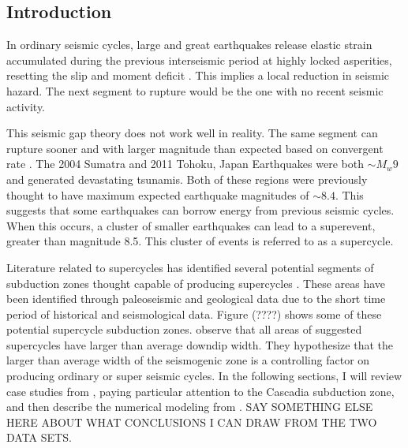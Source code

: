 \documentclass[draft,jgrga]{agutex}
\begin{document}
\begin{article}

\section{Introduction}
In ordinary seismic cycles, large and great earthquakes release elastic strain accumulated during the previous interseismic period at highly locked asperities, resetting the slip and moment deficit \citep{Nocquet2016}. This implies a local reduction in seismic hazard. The next segment to rupture would be the one with no recent seismic activity. 

This seismic gap theory does not work well in reality. The same segment can rupture sooner and with larger magnitude than expected based on convergent rate \citep{Nocquet2016}. The 2004 Sumatra and 2011 Tohoku, Japan Earthquakes were both $\sim M_w 9$ and generated devastating tsunamis. Both of these regions were previously thought to have maximum expected earthquake magnitudes of $\sim 8.4$. This suggests that some earthquakes can borrow energy from previous seismic cycles. When this occurs, a cluster of smaller earthquakes can lead to a superevent, greater than magnitude 8.5. This cluster of events is referred to as a supercycle. 

Literature related to supercycles has identified several potential segments of subduction zones thought capable of producing supercycles \citep{Goldfinger2013, Herrendorfer2015, Nocquet2016}. These areas have been identified through paleoseismic and geological data due to the short time period of historical and seismological data. Figure (????) shows some of these potential supercycle subduction zones. \citet{Herrendorfer2015} observe that all areas of suggested supercycles have larger than average downdip width. They hypothesize that the larger than average width of the seismogenic zone is a controlling factor on producing ordinary or super seismic cycles. In the following sections, I will review case studies from \citet{Goldfinger2013}, paying particular attention to the Cascadia subduction zone, and then describe the numerical modeling from \citet{Herrendorfer2015}. SAY SOMETHING ELSE HERE ABOUT WHAT CONCLUSIONS I CAN DRAW FROM THE TWO DATA SETS.



\end{article}
\end{document}
